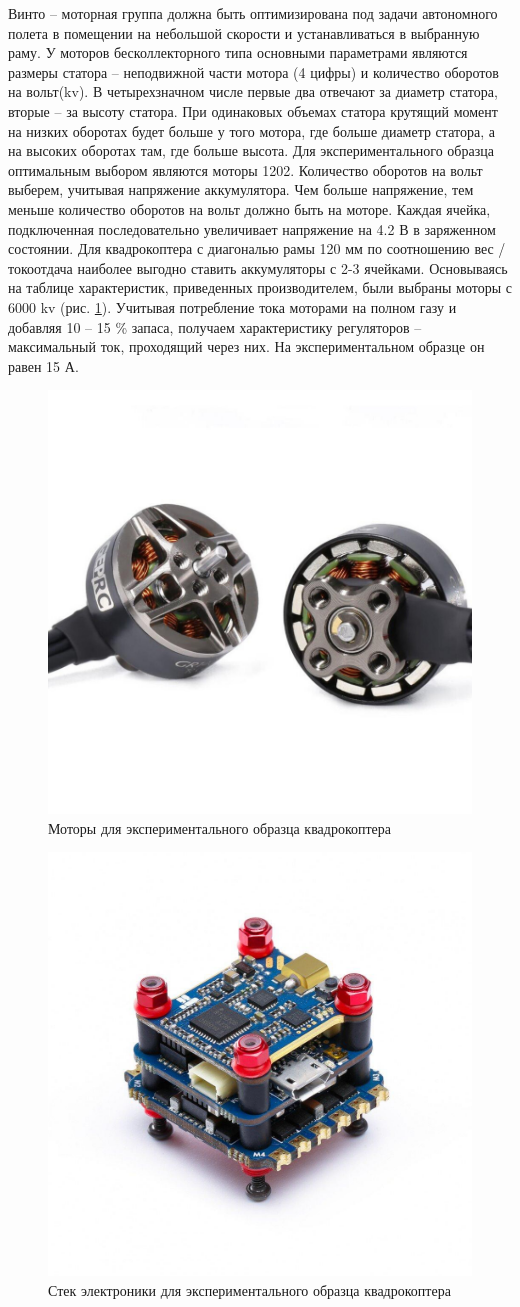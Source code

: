 Винто -- моторная группа должна быть оптимизирована под задачи автономного полета в помещении на небольшой скорости и устанавливаться в выбранную раму. У моторов бесколлекторного типа основными параметрами являются размеры статора -- неподвижной части мотора (4 цифры) и количество оборотов на вольт(kv). В четырехзначном числе первые два отвечают за диаметр статора, вторые -- за высоту статора. При одинаковых объемах статора крутящий момент на низких оборотах будет больше у того мотора, где больше диаметр статора, а на высоких оборотах там, где больше высота. Для экспериментального образца оптимальным выбором являются моторы 1202. Количество оборотов на вольт выберем, учитывая напряжение аккумулятора. Чем больше напряжение, тем меньше количество оборотов на вольт должно быть на моторе. Каждая ячейка, подключенная последовательно увеличивает напряжение на 4.2 В в заряженном состоянии. Для квадрокоптера с диагональю рамы 120 мм по соотношению вес / токоотдача наиболее выгодно ставить аккумуляторы с 2-3 ячейками. Основываясь на таблице характеристик, приведенных производителем, были выбраны моторы с 6000 kv (рис. \ref{fig:motor}).
Учитывая потребление тока моторами на полном газу и добавляя 10 -- 15 \% запаса, получаем характеристику регуляторов -- максимальный ток, проходящий через них. На экспериментальном образце он равен 15 А.
\begin{figure}[H]
	\centering
	\includegraphics[width=0.5\linewidth]{pics/motor}
	\caption{Моторы для экспериментального образца квадрокоптера
	}
	\label{fig:motor} %
\end{figure}
\begin{figure}[H]
	\centering
	\includegraphics[width=0.5\linewidth]{pics/stack}
	\caption{Стек электроники для экспериментального образца квадрокоптера
	}
	\label{fig:stack} %
\end{figure}
